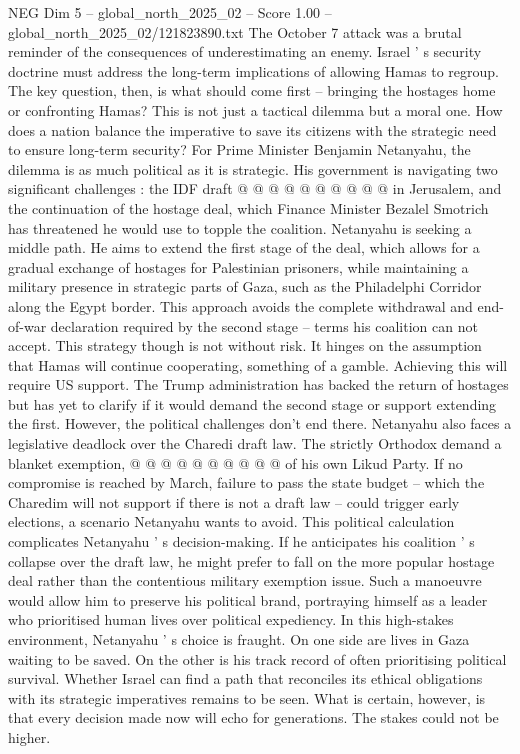 \begin{textsample}{NEG Dim 5 – global\_north\_2025\_02 – Score 1.00 – global\_north\_2025\_02/121823890.txt}
The October 7 attack was a brutal reminder of the consequences of underestimating an enemy.
Israel ' s security doctrine must address the long-term implications of allowing Hamas to regroup.
The key question, then, is what should come first -- bringing the hostages home or confronting Hamas?
This is not just a tactical dilemma but a moral one.
How does a nation balance the imperative to save its citizens with the strategic need to ensure long-term security?
For Prime Minister Benjamin Netanyahu, the dilemma is as much political as it is strategic.
His government is navigating two significant challenges : the IDF draft @ @ @ @ @ @ @ @ @ @ in Jerusalem, and the continuation of the hostage deal, which Finance Minister Bezalel Smotrich has threatened he would use to topple the coalition.
Netanyahu is seeking a middle path.
He aims to extend the first stage of the deal, which allows for a gradual exchange of hostages for Palestinian prisoners, while maintaining a military presence in strategic parts of Gaza, such as the Philadelphi Corridor along the Egypt border.
This approach avoids the complete withdrawal and end-of-war declaration required by the second stage -- terms his coalition can not accept.
This strategy though is not without risk.
It hinges on the assumption that Hamas will continue cooperating, something of a gamble.
Achieving this will require US support.
The Trump administration has backed the return of hostages but has yet to clarify if it would demand the second stage or support extending the first.
However, the political challenges don't end there.
Netanyahu also faces a legislative deadlock over the Charedi draft law.
The strictly Orthodox demand a blanket exemption, @ @ @ @ @ @ @ @ @ @ of his own Likud Party.
If no compromise is reached by March, failure to pass the state budget -- which the Charedim will not support if there is not a draft law -- could trigger early elections, a scenario Netanyahu wants to avoid.
This political calculation complicates Netanyahu ' s decision-making.
If he anticipates his coalition ' s collapse over the draft law, he might prefer to fall on the more popular hostage deal rather than the contentious military exemption issue.
Such a manoeuvre would allow him to preserve his political brand, portraying himself as a leader who prioritised human lives over political expediency.
In this high-stakes environment, Netanyahu ' s choice is fraught.
On one side are lives in Gaza waiting to be saved.
On the other is his track record of often prioritising political survival.
Whether Israel can find a path that reconciles its ethical obligations with its strategic imperatives remains to be seen.
What is certain, however, is that every decision made now will echo for generations.
The stakes could not be higher.

\end{textsample}
